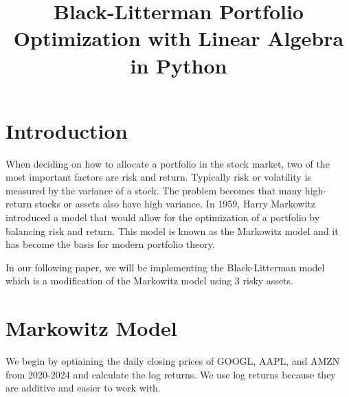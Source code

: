 \documentclass[journal,transmag]{IEEEtran}
\begin{document}
\title{Black-Litterman Portfolio\\ Optimization with Linear Algebra in Python}

\author{
}

\maketitle


\IEEEdisplaynontitleabstractindextext
\IEEEpeerreviewmaketitle



\section{Introduction}
When deciding on how to allocate a portfolio in the stock market, two of the most important factors are risk and return. Typically risk or volatility is 
measured by the variance of a stock. The problem becomes that many high-return stocks or assets also have high variance. In 1959, Harry Markowitz 
introduced a model that would allow for the optimization of a portfolio by balancing risk and return. This model is known as the Markowitz model \cite{markowitz1959} and 
it has become the basis for modern portfolio theory. 

In our following paper, we will be implementing the Black-Litterman model \cite{black1992global} which is a modification of the Markowitz model using 3 risky assets. 
\section{Markowitz Model}
We begin by optiaining the daily closing prices of GOOGL, AAPL, and AMZN from 2020-2024 and calculate the log returns. We use 
log returns because they are additive and easier to work with. 
\end{document}
